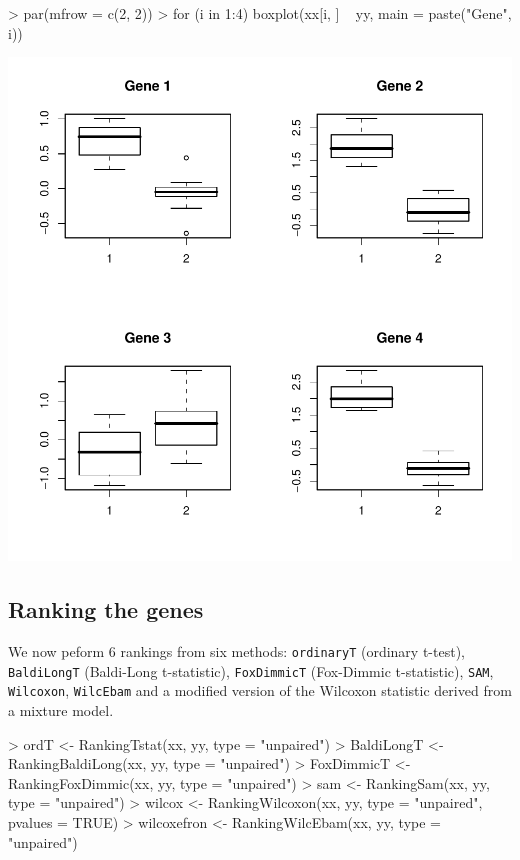 \begin{Schunk}
\begin{Sinput}
> par(mfrow = c(2, 2))
> for (i in 1:4) boxplot(xx[i, ] ~ yy, main = paste("Gene", i))
\end{Sinput}
\end{Schunk}
\includegraphics{GeneSelector-003}



\subsection{Ranking the genes}

We now peform 6 rankings from six methods:
\texttt{ordinaryT} (ordinary t-test), \texttt{BaldiLongT} (Baldi-Long t-statistic),
\texttt{FoxDimmicT} (Fox-Dimmic t-statistic),
\texttt{SAM}, \texttt{Wilcoxon}, \texttt{WilcEbam} and a modified version
of the Wilcoxon statistic derived from a mixture model.

\begin{Schunk}
\begin{Sinput}
> ordT <- RankingTstat(xx, yy, type = "unpaired")
> BaldiLongT <- RankingBaldiLong(xx, yy, type = "unpaired")
> FoxDimmicT <- RankingFoxDimmic(xx, yy, type = "unpaired")
> sam <- RankingSam(xx, yy, type = "unpaired")
> wilcox <- RankingWilcoxon(xx, yy, type = "unpaired", pvalues = TRUE)
> wilcoxefron <- RankingWilcEbam(xx, yy, type = "unpaired")
\end{Sinput}
\end{Schunk}

